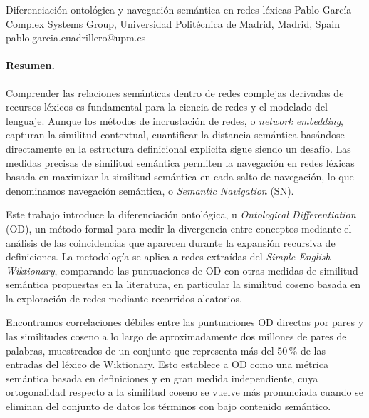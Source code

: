 \documentclass[11pt,a4paper]{article}
\begin{document}



\begin{sincabstract}
{Diferenciación ontológica y navegación semántica en redes léxicas}
{Pablo García}
{Complex Systems Group, Universidad Politécnica de Madrid, Madrid, Spain}
{pablo.garcia.cuadrillero@upm.es}

\paragraph{Resumen.}
Comprender las relaciones semánticas dentro de redes complejas derivadas de recursos léxicos es fundamental para la ciencia de redes y el modelado del lenguaje. Aunque los métodos de incrustación de redes, o \textit{network embedding}, capturan la similitud contextual, cuantificar la distancia semántica basándose directamente en la estructura definicional explícita sigue siendo un desafío. Las medidas precisas de similitud semántica permiten la navegación en redes léxicas basada en maximizar la similitud semántica en cada salto de navegación, lo que denominamos navegación semántica, o \textit{Semantic Navigation} (SN).

Este trabajo introduce la diferenciación ontológica, u \textit{Ontological Differentiation} (OD), un método formal para medir la divergencia entre conceptos mediante el análisis de las coincidencias que aparecen durante la expansión recursiva de definiciones. La metodología se aplica a redes extraídas del \textit{Simple English Wiktionary}, comparando las puntuaciones de OD con otras medidas de similitud semántica propuestas en la literatura, en particular la similitud coseno basada en la exploración de redes mediante recorridos aleatorios.

Encontramos correlaciones débiles entre las puntuaciones OD directas por pares y las similitudes coseno a lo largo de aproximadamente dos millones de pares de palabras, muestreados de un conjunto que representa más del 50\,\% de las entradas del léxico de Wiktionary. Esto establece a OD como una métrica semántica basada en definiciones y en gran medida independiente, cuya ortogonalidad respecto a la similitud coseno se vuelve más pronunciada cuando se eliminan del conjunto de datos los términos con bajo contenido semántico.


\end{sincabstract}
\end{document}
